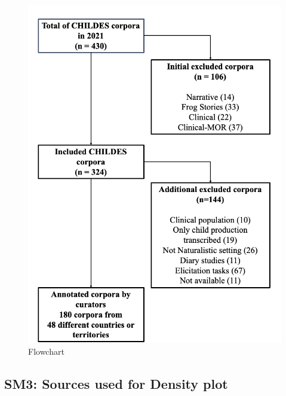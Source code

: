 \documentclass[
]{article}
\begin{document}
\begin{figure}
\centering
\includegraphics{../figures/flowchart.png}
\caption{Flowchart}
\end{figure}

\hypertarget{sm3-sources-used-for-density-plot}{%
\subsection{SM3: Sources used for Density
plot}\label{sm3-sources-used-for-density-plot}}
\end{document}
